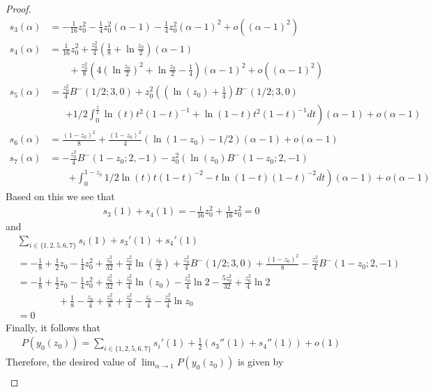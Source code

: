 \begin{proof}
\begin{align*}
s_3(\alpha) &= -\frac{1}{16}z_0^2 -\frac{1}{4}z_0^2(\alpha-1)-\frac{1}{4}z_0^2(\alpha-1)^2+o( (\alpha-1)^2) \\
s_4(\alpha) &= \frac{1}{16}z_0^2 +\frac{z_0^2}{4}\left(\frac{1}{8}+\ln\frac{z_0}{2}\right)(\alpha-1)\\
&\qquad+\frac{z_0^2}{8}\left(4\left(\ln\frac{z_0}{2}\right)^2+\ln\frac{z_0}{2} - \frac{1}{4}\right)(\alpha-1)^2+o( (\alpha-1)^2)\\
s_5(\alpha) &= \frac{z_0^2}{4} B^-(1/2;3,0) + z_0^2\left(\left(\ln(z_0)+\frac{1}{4}\right) B^-(1/2;3,0) \right. \\
 	&\hspace{20pt}\left.+1/2\int_0^{\frac{1}{2}} \ln(t)t^2(1-t)^{-1}+\ln(1-t)t^2(1-t)^{-1}dt \right)  (\alpha-1)+o (\alpha-1)\\
s_6(\alpha) &= \frac{(1-z_0)^2}{8}+\frac{(1-z_0)^2}{4} (\ln(1-z_0)-1/2 )(\alpha-1)+o(\alpha-1)\\
s_7(\alpha) &= -\frac{z_0^2}{4}B^-(1-z_0;2,-1) - z_0^2 \left(\ln(z_0)B^-(1-z_0;2,-1) \right. \\
&\qquad \left.+\int_0^{1-z_0} 1/2\ln(t)t(1-t)^{-2}-t\ln(1-t)(1-t)^{-2}dt \right) (\alpha-1)+o(\alpha-1)
\end{align*}
Based on this we see that
\begin{align*}
s_3(1)+s_4(1)=-\frac{1}{16}z_0^2+\frac{1}{16}z_0^2 =0
\end{align*}
and
\begin{align*}
&\sum_{i\in \{1,2,5,6,7\}} s_i(1) + s_3'(1)+s_4'(1) \\
&= -\frac{1}{8}+\frac{1}{2}z_0-\frac{1}{4}z_0^2+\frac{z_0^2}{32}+\frac{z_0^2}{4}\ln(\frac{z_0}{2}) 
+\frac{z_0^2}{4}B^-(1/2;3,0)+\frac{(1-z_0)^2}{8}-\frac{z_0^2}{4}B^-(1-z_0;2,-1) \\
&=-\frac{1}{8}+\frac{1}{2}z_0-\frac{1}{4}z_0^2+\frac{z_0^2}{32}+\frac{z_0^2}{4}\ln(z_0)-\frac{z_0^2}{4}\ln 2 
-\frac{5z_0^2}{32}+\frac{z_0^2}{4}\ln2 \\ 
&\hspace{50pt}+\frac{1}{8}-\frac{z_0}{4}+\frac{z_0^2}{8}+\frac{z_0^2}{4}-\frac{z_0}{4}-\frac{z_0^2}{4}\ln z_0 \\
&=0
\end{align*}
Finally, it follows that
\begin{align*}
P(y_0(z_0)) = \sum_{i \in\{1,2,5,6,7\}} s_i'(1)+\frac{1}{2}(s_3''(1)+s_4''(1)) + o(1)
\end{align*}
Therefore, the desired value of $\lim_{\alpha \rightarrow 1} P(y_0(z_0))$ is given by
\begin{align*}

\end{align*}
\end{proof}
